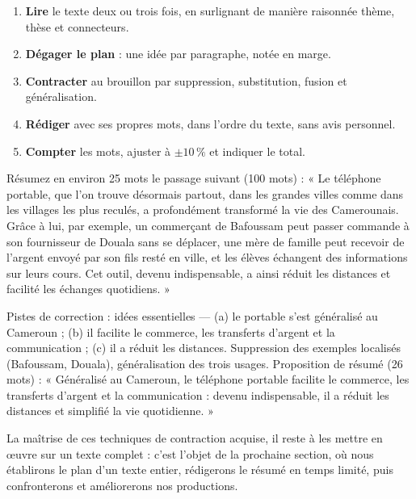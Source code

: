 \documentclass[11pt]{article}
\begin{document}
\begin{methode}
\begin{enumerate}
\item \textbf{Lire} le texte deux ou trois fois, en surlignant de manière raisonnée thème, thèse et connecteurs.
\item \textbf{Dégager le plan} : une idée par paragraphe, notée en marge.
\item \textbf{Contracter} au brouillon par suppression, substitution, fusion et généralisation.
\item \textbf{Rédiger} avec ses propres mots, dans l'ordre du texte, sans avis personnel.
\item \textbf{Compter} les mots, ajuster à $\pm 10\,\%$ et indiquer le total.
\end{enumerate}
\end{methode}

\begin{exercice}
Résumez en environ 25 mots le passage suivant (100 mots) : « Le téléphone portable, que l'on trouve désormais partout, dans les grandes villes comme dans les villages les plus reculés, a profondément transformé la vie des Camerounais. Grâce à lui, par exemple, un commerçant de Bafoussam peut passer commande à son fournisseur de Douala sans se déplacer, une mère de famille peut recevoir de l'argent envoyé par son fils resté en ville, et les élèves échangent des informations sur leurs cours. Cet outil, devenu indispensable, a ainsi réduit les distances et facilité les échanges quotidiens. »
\end{exercice}

\begin{corrige}[Exercice]
Pistes de correction : idées essentielles — (a) le portable s'est généralisé au Cameroun ; (b) il facilite le commerce, les transferts d'argent et la communication ; (c) il a réduit les distances. Suppression des exemples localisés (Bafoussam, Douala), généralisation des trois usages. Proposition de résumé (26 mots) : « Généralisé au Cameroun, le téléphone portable facilite le commerce, les transferts d'argent et la communication : devenu indispensable, il a réduit les distances et simplifié la vie quotidienne. »
\end{corrige}

La maîtrise de ces techniques de contraction acquise, il reste à les mettre en œuvre sur un texte complet : c'est l'objet de la prochaine section, où nous établirons le plan d'un texte entier, rédigerons le résumé en temps limité, puis confronterons et améliorerons nos productions.
\end{document}
